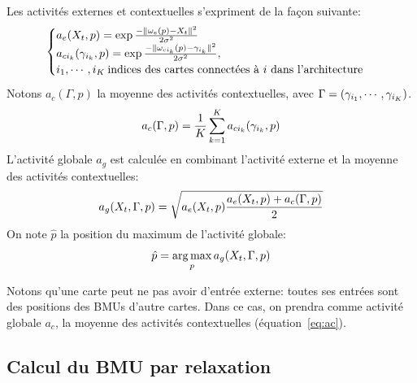 Les activités externes et contextuelles s'expriment de la façon suivante:
\begin{equation}
\label{eq:activite}
\begin{cases}
a_e(X_t,p) = \exp\frac{-\lVert \omega_e(p)-X_t \rVert^2}{2\sigma^2} \\
a_{ci_k}(\gamma_{i_k},p) = \exp\frac{-\lVert \omega_{ci_k}(p)-\gamma_{i_k} \rVert ^2}{2\sigma^2}, \\
i_1, \cdots, i_K\: \text{indices des cartes connectées à $i$ dans l'architecture}
\end{cases}
\end{equation}
Notons $a_c(\Gamma,p)$ la moyenne des activités contextuelles, avec $\Gamma = (\gamma_{i_1}, \cdots, \gamma_{i_K})$.
\begin{equation}\label{eq:ac}
a_c(\Gamma,p) = \frac{1}{K}\sum_{k=1}^K {a_{ci_k}(\gamma_{i_k},p)}
\end{equation}
L'activité globale $a_g$ est calculée en combinant l'activité externe et la moyenne des activités contextuelles:
\begin{equation}
\label{eq:global_act}
a_g(X_t,\Gamma,p) = \sqrt{a_e(X_t,p) \frac{a_e(X_t,p) +  a_c(\Gamma,p)}{2}}
\end{equation} 
On note $\hat{p}$ la position du maximum de l'activité globale:
\begin{equation}
\label{argmax}
\hat{p} = \operatorname*{arg\,max}_p a_g(X_t, \Gamma,p)
\end{equation}

Notons qu'une carte peut ne pas avoir d'entrée externe: toutes ses entrées sont des positions des BMUs d'autre cartes. Dans ce cas, on prendra comme activité globale $a_c$, la moyenne des activités contextuelles (équation~\ref{eq:ac}).

\subsection{Calcul du BMU par relaxation}\label{sec:relax}


